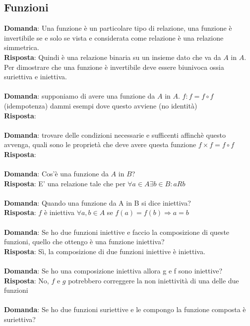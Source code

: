 \documentclass{article}
\begin{document}
\subsection{Funzioni}
\textbf{Domanda}: Una funzione è un particolare tipo di relazione, una funzione è invertibile se e solo se vista e considerata come relazione è una relazione simmetrica. \\
\textbf{Risposta}: Quindi è una relazione binaria su un insieme dato che va da $A$ in $A$. Per dimostrare che una funzione è invertibile deve essere biunivoca ossia suriettiva e iniettiva. \\ \\
\textbf{Domanda}: supponiamo di avere una funzione da $A$ in $A$. $f: f = f \circ f$ (idempotenza) dammi esempi dove questo avviene (no identità) \\
\textbf{Risposta}: \\ \\
\textbf{Domanda}: trovare delle condizioni necessarie e sufficenti affinchè questo avvenga, quali sono le proprietà che deve avere questa funzione $f \times f = f \circ f$ \\
\textbf{Risposta}: \\ \\
\textbf{Domanda}: Cos'è una funzione da $A$ in $B$? \\
\textbf{Risposta}: E' una relazione tale che per $ \forall a \in A \exists b \in B: a R b$ \\ \\
\textbf{Domanda}: Quando una funzione da A in B si dice iniettiva? \\
\textbf{Risposta}: $f$ è iniettiva $ \forall a,b \in A$ se $f(a) = f(b) \Rightarrow a = b$ \\ \\
\textbf{Domanda}: Se ho due funzioni iniettive e faccio la composizione di queste funzioni, quello che ottengo è una funzione iniettiva? \\
\textbf{Risposta}: Sì, la composizione di due funzioni iniettive è iniettiva. \\ \\
\textbf{Domanda}: Se ho una composizione iniettiva allora g e f sono iniettive? \\
\textbf{Risposta}: No, $f$ e $g$ potrebbero correggere la non iniettività di una delle due funzioni\\ \\
\textbf{Domanda}: Se ho due funzioni suriettive e le compongo la funzione composta è suriettiva? \\
\end{document}
